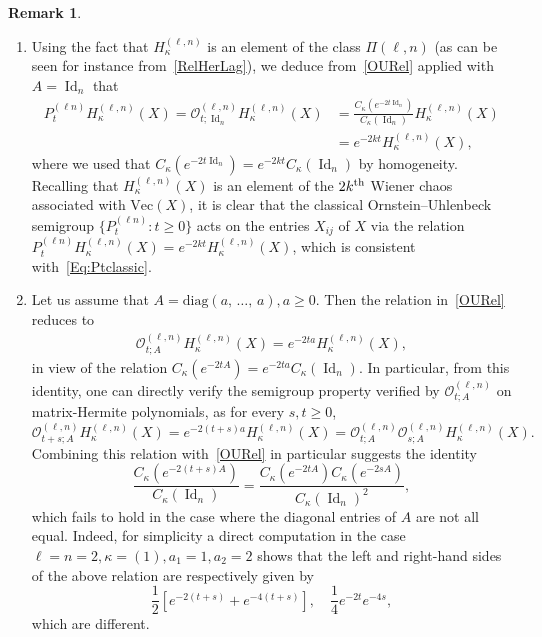 \documentclass[10pt]{amsart}
\theoremstyle{definition}\newtheorem{defi}[theo]{Definition}\newtheorem{rema}[theo]{Remark}\newtheorem{exam}[theo]{Example}\newtheorem{exem}[theo]{Example}\newtheorem{nota}[theo]{Notation}
\DeclareMathOperator{\Id}{Id}
\newcommand{\diag}{\mathrm{diag}}
\renewcommand{\Vec}{\mathrm{Vec}}
\newcommand{\clO}{\mathcal{O}}
\newcommand*{\alphenumi}{\renewcommand*{\theenumi}{\alph{enumi}}}
\begin{document}
\begin{rema}\label{RemOU}\leavevmode
\begin{enumerate}\alphenumi
\item Using the fact that $H_{\kappa}^{(\ell,n)}$ is an element of the class $\Pi(\ell,n)$ (as can be seen for instance from~\eqref{RelHerLag}), we deduce from~\eqref{OURel} applied with $A=\Id_n$ that
\begin{equation}\label{Eq:Ptclassic}
\begin{split}
P_t^{(\ell n)} H_{\kappa}^{(\ell,n)}(X) =\clO_{t;\Id_n}^{(\ell,n)} H_{\kappa}^{(\ell,n)}(X) &= \frac{C_{\kappa}\left(e^{-2t\Id_n}\right)}{C_{\kappa}(\Id_n)} H_{\kappa}^{(\ell,n)}(X) \\
&= e^{-2kt} H_{\kappa}^{(\ell,n)}(X),
\end{split}
\end{equation}
where we used that $C_{\kappa}(e^{-2t\Id_n})=e^{-2kt}C_{\kappa}(\Id_n)$ by homogeneity. Recalling that $H_{\kappa}^{(\ell,n)}(X)$ is an element of the $2k^{\rm th}$ Wiener chaos associated with $\Vec(X)$, it is clear that the classical Ornstein--Uhlenbeck semigroup $\{P_t^{(\ell n)}:t\geq0\}$ acts on the entries $X_{ij}$ of $X$ via the relation $P_t^{(\ell n)} H_{\kappa}^{(\ell,n)}(X) = e^{-2kt} H_{\kappa}^{(\ell,n)}(X)$, which is consistent with~\eqref{Eq:Ptclassic}.
\item\label{rema3.11.b} Let us assume that $A=\diag(a,\,\ldots,\,a), a\geq0$. Then the relation in~\eqref{OURel} reduces to
\begin{gather*}
\clO_{t;A}^{(\ell,n)}H_{\kappa}^{(\ell,n)}(X) = e^{-2ta}H_{\kappa}^{(\ell,n)}(X),
\end{gather*}
in view of the relation $C_{\kappa}(e^{-2tA}) = e^{-2ta}C_{\kappa}(\Id_n)$. In particular, from this identity, one can directly verify the semigroup property verified by $\clO_{t;A}^{(\ell,n)}$ on matrix-Hermite polynomials, as for every $s,t\geq 0$,
\[
\clO_{t+s;A}^{(\ell,n)} H_{\kappa}^{(\ell,n)}(X) = e^{-2(t+s)a}H_{\kappa}^{(\ell,n)}(X) = \clO_{t;A}^{(\ell,n)} \clO_{s;A}^{(\ell,n)} H_{\kappa}^{(\ell,n)}(X).
\]
Combining this relation with~\eqref{OURel} in particular suggests the identity
\[
\frac{C_{\kappa}\left(e^{-2(t+s)A}\right)}{C_{\kappa}(\Id_n)} = \frac{C_{\kappa}\left(e^{-2tA}\right)C_{\kappa}\left(e^{-2sA}\right)}{C_{\kappa}(\Id_n)^2},
\]
which fails to hold in the case where the diagonal entries of $A$ are not all equal. Indeed, for simplicity a direct computation in the case $\ell=n=2, \kappa=(1), a_1=1, a_2=2$ shows that the left and right-hand sides of the above relation are respectively given by
\[
\frac{1}{2} \left[e^{-2(t+s)} + e^{-4(t+s)}\right], \quad
\frac{1}{4} e^{-2t} e^{-4s},
\]
which are different.
\end{enumerate}
\end{rema}
\end{document}

